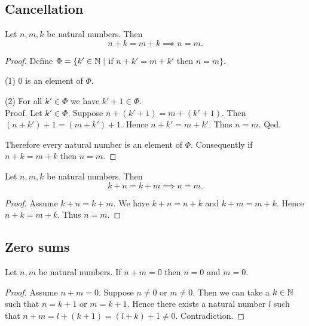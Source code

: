 \documentclass[../arithmetic.tex]{subfiles}
\begin{document}
  \subsection*{Cancellation}

  \begin{forthel}
    \begin{proposition}
      Let $n, m, k$ be natural numbers.
      Then \[ n \plus k = m \plus k \implies n = m. \]
    \end{proposition}
    \begin{proof}
      Define $\Phi = \{ k' \in \mathbb{N} \mid$ if $n \plus k' = m \plus k'$ then $n = m \}$.

      (1) $0$ is an element of $\Phi$.

      (2) For all $k' \in \Phi$ we have $k' \plus 1 \in \Phi$. \\
      Proof.
        Let $k' \in \Phi$.
        Suppose $n \plus (k' \plus 1) = m \plus (k' \plus 1)$.
        Then $(n \plus k') \plus 1 = (m \plus k') \plus 1$.
        Hence $n \plus k' = m \plus k'$.
        Thus $n = m$.
      Qed.

      Therefore every natural number is an element of $\Phi$.
      Consequently if $n \plus k = m \plus k$ then $n = m$.
    \end{proof}
  \end{forthel}

  \begin{forthel}
    \begin{corollary}
      Let $n, m, k$ be natural numbers.
      Then \[ k \plus n = k \plus m \implies n = m. \]
    \end{corollary}
    \begin{proof}
      Assume $k \plus n = k \plus m$.
      We have $k \plus n = n \plus k$ and $k \plus m = m \plus k$.
      Hence $n \plus k = m \plus k$.
      Thus $n = m$.
    \end{proof}
  \end{forthel}


  \subsection*{Zero sums}

  \begin{forthel}
    \begin{proposition}
      Let $n, m$ be natural numbers.
      If $n \plus m = 0$ then $n = 0$ and $m = 0$.
    \end{proposition}
    \begin{proof}
      Assume $n \plus m = 0$.
      Suppose $n \neq 0$ or $m \neq 0$.
      Then we can take a $k \in \mathbb{N}$ such that $n = k \plus 1$ or $m = k \plus 1$.
      Hence there exists a natural number $l$ such that
      $n \plus m
        = l \plus (k \plus 1)
        = (l \plus k) \plus 1
        \neq 0$.
      Contradiction.
    \end{proof}
  \end{forthel}
\end{document}
